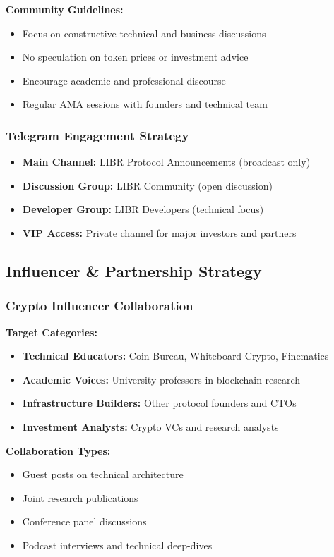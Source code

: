 \documentclass[12pt,a4paper]{article}
\begin{document}
\textbf{Community Guidelines:}
\begin{itemize}
    \item Focus on constructive technical and business discussions
    \item No speculation on token prices or investment advice
    \item Encourage academic and professional discourse
    \item Regular AMA sessions with founders and technical team
\end{itemize}

\subsubsection{Telegram Engagement Strategy}
\begin{itemize}
    \item \textbf{Main Channel:} LIBR Protocol Announcements (broadcast only)
    \item \textbf{Discussion Group:} LIBR Community (open discussion)
    \item \textbf{Developer Group:} LIBR Developers (technical focus)
    \item \textbf{VIP Access:} Private channel for major investors and partners
\end{itemize}

\subsection{Influencer \& Partnership Strategy}

\subsubsection{Crypto Influencer Collaboration}
\textbf{Target Categories:}
\begin{itemize}
    \item \textbf{Technical Educators:} Coin Bureau, Whiteboard Crypto, Finematics
    \item \textbf{Academic Voices:} University professors in blockchain research
    \item \textbf{Infrastructure Builders:} Other protocol founders and CTOs
    \item \textbf{Investment Analysts:} Crypto VCs and research analysts
\end{itemize}

\textbf{Collaboration Types:}
\begin{itemize}
    \item Guest posts on technical architecture
    \item Joint research publications
    \item Conference panel discussions
    \item Podcast interviews and technical deep-dives
\end{itemize}
\end{document}
